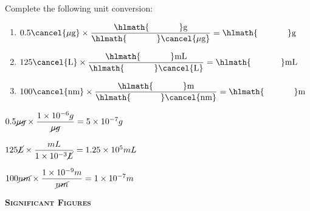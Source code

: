 \documentclass[main.tex]{subfiles}
\begin{document}
\begin{multicols*}{2}
\begin{question}[ID=\the\value{numA}]
Complete the following unit conversion:
  \noindent
  \begin{enumerate} [topsep=0pt, partopsep=1pt, label=(\alph*), leftmargin=1cm]
  \item $0.5\cancel{ \mu \text{g}} \times \dfrac{  \hlmath{\hspace{35pt}}  \text{g}}{\hlmath{\hspace{35pt}} \cancel{ \mu \text{g}}}= \hlmath{\hspace{35pt}}   \text{g}$
\item $125\cancel{ \text{L}} \times \dfrac{  \hlmath{\hspace{35pt}}  \text{mL}}{\hlmath{\hspace{35pt}} \cancel{ \text{L}}}= \hlmath{\hspace{35pt}}   \text{mL}$
  \item $100\cancel{ \text{nm}} \times \dfrac{  \hlmath{\hspace{35pt}}  \text{m}}{\hlmath{\hspace{35pt}} \cancel{ \text{nm}}}= \hlmath{\hspace{35pt}}   \text{m}$
  \end{enumerate}
\end{question}
\begin{solution}
\begin{inparaenum}[(a)]
 \item $0.5\cancel{ \mu g} \times \dfrac{  1\times 10^{-6}  g}{    \cancel{ \mu g}}=     5\times 10^{-7}g$
\item $125\cancel{ L} \times \dfrac{     mL}{    1\times 10^{-3} \cancel{ L}}=   1.25\times 10^{5}  mL$
\item $100\cancel{ nm} \times \dfrac{   1\times 10^{-9}  m}{   \cancel{ nm}}=   1\times 10^{-7}  m$
\end{inparaenum}
\hspace{0.1cm}\end{solution}%


{\raggedright\textsc{\textbf{Significant Figures }}\par}


\end{multicols*}
\end{document}
